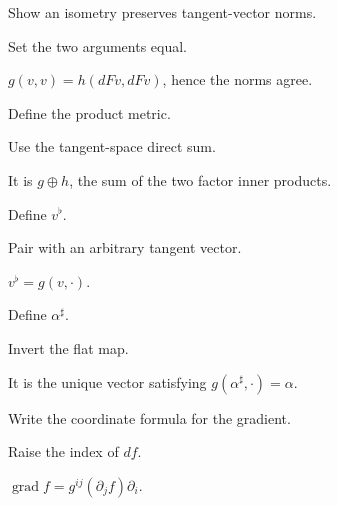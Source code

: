 \begin{exercise}\label{exr:vii20-15}
Show an isometry preserves tangent-vector norms.
\end{exercise}
\begin{hint}
Set the two arguments equal.
\end{hint}
\begin{solution}
\(g(v,v)=h(dFv,dFv)\), hence the norms agree.
\end{solution}

\begin{exercise}\label{exr:vii20-16}
Define the product metric.
\end{exercise}
\begin{hint}
Use the tangent-space direct sum.
\end{hint}
\begin{solution}
It is \(g\oplus h\), the sum of the two factor inner products.
\end{solution}

\begin{exercise}\label{exr:vii20-17}
Define \(v^\flat\).
\end{exercise}
\begin{hint}
Pair with an arbitrary tangent vector.
\end{hint}
\begin{solution}
\(v^\flat=g(v,\cdot)\).
\end{solution}

\begin{exercise}\label{exr:vii20-18}
Define \(\alpha^\sharp\).
\end{exercise}
\begin{hint}
Invert the flat map.
\end{hint}
\begin{solution}
It is the unique vector satisfying \(g(\alpha^\sharp,\cdot)=\alpha\).
\end{solution}

\begin{exercise}\label{exr:vii20-19}
Write the coordinate formula for the gradient.
\end{exercise}
\begin{hint}
Raise the index of \(df\).
\end{hint}
\begin{solution}
\(\operatorname{grad}f=g^{ij}(\partial_jf)\partial_i\).
\end{solution}

